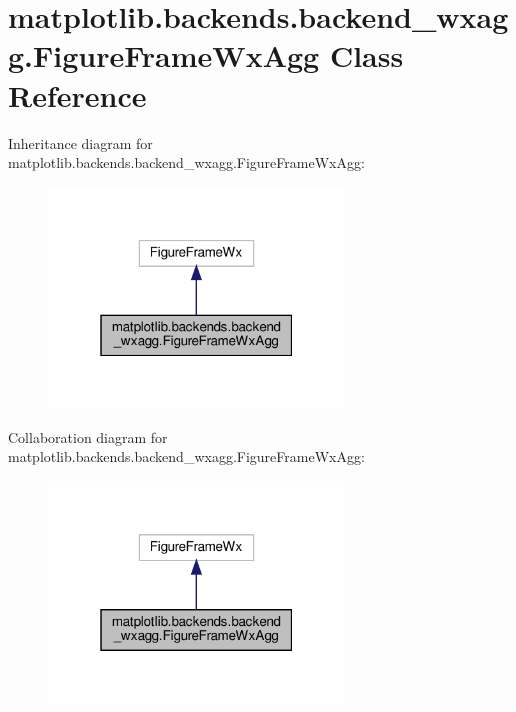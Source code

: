 \hypertarget{classmatplotlib_1_1backends_1_1backend__wxagg_1_1FigureFrameWxAgg}{}\section{matplotlib.\+backends.\+backend\+\_\+wxagg.\+Figure\+Frame\+Wx\+Agg Class Reference}
\label{classmatplotlib_1_1backends_1_1backend__wxagg_1_1FigureFrameWxAgg}


Inheritance diagram for matplotlib.\+backends.\+backend\+\_\+wxagg.\+Figure\+Frame\+Wx\+Agg\+:
\nopagebreak
\begin{figure}[H]
\begin{center}
\leavevmode
\includegraphics[width=223pt]{classmatplotlib_1_1backends_1_1backend__wxagg_1_1FigureFrameWxAgg__inherit__graph}
\end{center}
\end{figure}


Collaboration diagram for matplotlib.\+backends.\+backend\+\_\+wxagg.\+Figure\+Frame\+Wx\+Agg\+:
\nopagebreak
\begin{figure}[H]
\begin{center}
\leavevmode
\includegraphics[width=223pt]{classmatplotlib_1_1backends_1_1backend__wxagg_1_1FigureFrameWxAgg__coll__graph}
\end{center}
\end{figure}
